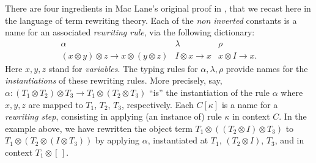 There are four  ingredients in Mac Lane's original proof in \cite{MacLane98}, that we recast here in the language of term rewriting theory. 
Each of the {\em non inverted} constants is a name for an associated {\em rewriting rule}, via the following dictionary:
$$\begin{array}{ccc}
\alpha & \lambda & \rho\\
(x\otimes y)\otimes z\rightarrow x\otimes(y\otimes z) & I\otimes x\rightarrow x & x\otimes I \rightarrow x.
\end{array}$$
Here $x,y,z$ stand for {\em variables}. The typing rules for $\alpha,\lambda,\rho$ provide names for the {\em instantiations} of these rewriting rules. More precisely, say,  $\alpha:(T_1\otimes T_2)\otimes T_3\rightarrow T_1\otimes(T_2\otimes T_3)$ ``is'' the instantiation of the rule $\alpha$
where $x,y,z$ are mapped to $T_1$, $T_2$, $T_3$, respectively.
Each $C[\kappa]$ is a name for a {\em rewriting step}, consisting in applying (an instance of) rule $\kappa$ in context $C$.
In the example above, we have rewritten the object term $T_1\otimes((T_2\otimes I)\otimes T_3)$ to $T_1\otimes(T_2\otimes (I\otimes T_3))$ by applying $\alpha$, instantiated at $T_1$, $(T_2\otimes I)$, $T_3$, and in context $T_1\otimes[\,]$.

